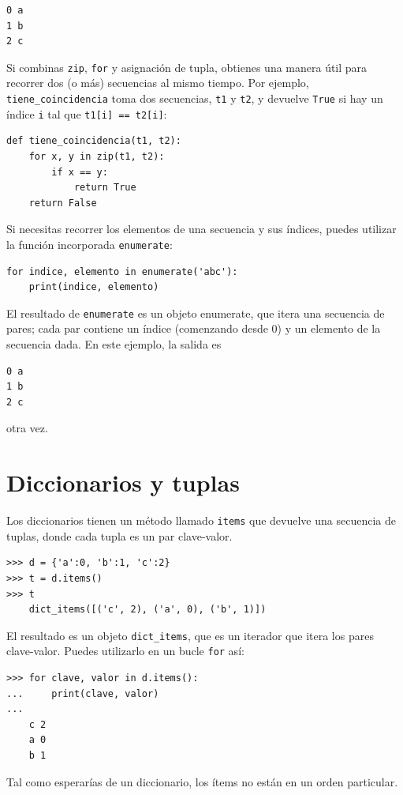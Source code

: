 \documentclass[10pt]{book}
\begin{document}
\begin{verbatim}
0 a
1 b
2 c
\end{verbatim}
%
Si combinas {\tt zip}, {\tt for} y asignación de tupla, obtienes una
manera útil para recorrer dos (o más) secuencias al mismo
tiempo.  Por ejemplo, \verb"tiene_coincidencia" toma dos secuencias, {\tt t1} y
{\tt t2}, y devuelve {\tt True} si hay un índice {\tt i}
tal que {\tt t1[i] == t2[i]}:

\begin{verbatim}
def tiene_coincidencia(t1, t2):
    for x, y in zip(t1, t2):
        if x == y:
            return True
    return False
\end{verbatim}
%
Si necesitas recorrer los elementos de una secuencia y sus
índices, puedes utilizar la función incorporada {\tt enumerate}:

\begin{verbatim}
for indice, elemento in enumerate('abc'):
    print(indice, elemento)
\end{verbatim}
%
El resultado de {\tt enumerate} es un objeto enumerate, que
itera una secuencia de pares; cada par contiene un índice (comenzando
desde 0) y un elemento de la secuencia dada.
En este ejemplo, la salida es

\begin{verbatim}
0 a
1 b
2 c
\end{verbatim}
%
otra vez.


\section{Diccionarios y tuplas}
\label{dictuple}

Los diccionarios tienen un método llamado {\tt items} que devuelve una secuencia de
tuplas, donde cada tupla es un par clave-valor.

\begin{verbatim}
>>> d = {'a':0, 'b':1, 'c':2}
>>> t = d.items()
>>> t
    dict_items([('c', 2), ('a', 0), ('b', 1)])
\end{verbatim}
%
El resultado es un objeto \verb"dict_items", que es un iterador que
itera los pares clave-valor.  Puedes utilizarlo en un bucle {\tt for}
así:

\begin{verbatim}
>>> for clave, valor in d.items():
...     print(clave, valor)
...
    c 2
    a 0
    b 1
\end{verbatim}
%
Tal como esperarías de un diccionario, los ítems no están en un
orden particular.
\end{document}

